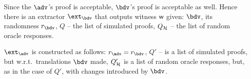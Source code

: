 \documentclass[runningheads,11pt]{llncs}
\begin{document}
Since the $\adv$'s proof is acceptable, $\bdv$'s proof is acceptable as
well. Hence there is an extractor $\ext_\bdv$ that outputs witness $\mathsf{w}$ given:
$\bdv$, its randomness $r_\bdv$, $Q$ -- the list of simulated proofs, $Q_{\mathcal{H}}$ -- the list
of random oracle responses.

$\ext_\adv$ is constructed as follows: $r_\adv = r_\bdv$, $Q'$ -- is a list of
simulated proofs, but w.r.t.~translations $\bdv$ made, $Q'_{\mathcal{H}}$ is a list of
random oracle responses, but, as in the case of $Q'$, with changes introduced by $\bdv$.
\end{document}
